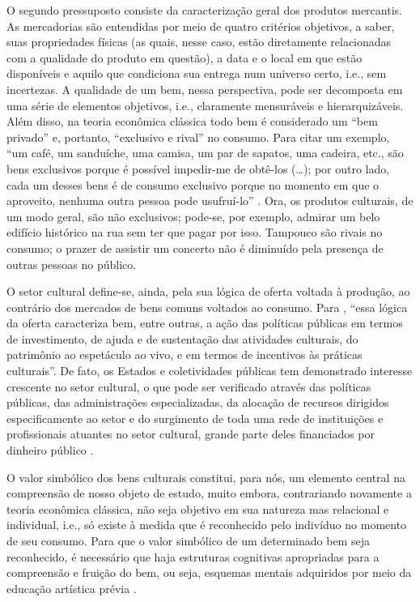 \documentclass[a4paper, 12pt, openright, oneside, german, french, english, brazil, article]{abntex2}
\begin{document}
O segundo pressuposto consiste da caracterização geral dos produtos mercantis. As mercadorias são entendidas por meio de quatro critérios objetivos, a saber, suas propriedades físicas (as quais, nesse caso, estão diretamente relacionadas com a qualidade do produto em questão), a data e o local em que estão disponíveis e aquilo que condiciona sua entrega num universo certo, i.e., sem incertezas. A qualidade de um bem, nessa perspectiva, pode ser decomposta em uma série de elementos objetivos, i.e., claramente mensuráveis e hierarquizáveis. Além disso, na teoria econômica clássica todo bem é considerado um ``bem privado'' e, portanto, ``exclusivo e rival'' no consumo. Para citar um exemplo, ``um café, um sanduíche, uma camisa, um par de sapatos, uma cadeira, etc., são bens exclusivos porque é possível impedir-me de obtê-los (\ldots); por outro lado, cada um desses bens é de consumo exclusivo porque no momento em que o aproveito, nenhuma outra pessoa pode usufruí-lo'' \cite[p. 29]{tolila2007cultura}. Ora, os produtos culturais, de um modo geral, são não exclusivos; pode-se, por exemplo, admirar um belo edifício histórico na rua sem ter que pagar por isso. Tampouco são rivais no consumo; o prazer de assistir um concerto não é diminuído pela presença de outras pessoas no público.

O setor cultural define-se, ainda, pela sua lógica de oferta voltada à produção, ao contrário dos mercados de bens comuns voltados ao consumo. Para , ``essa lógica da oferta caracteriza bem, entre outras, a ação das políticas públicas em termos de investimento, de ajuda e de sustentação das atividades culturais, do patrimônio ao espetáculo ao vivo, e em termos de incentivos às práticas culturais''. De fato, os Estados e coletividades públicas tem demonstrado interesse crescente no setor cultural, o que pode ser verificado através das políticas públicas, das administrações especializadas, da alocação de recursos dirigidos especificamente ao setor e do surgimento de toda uma rede de instituições e profissionais atuantes no setor cultural, grande parte deles financiados por dinheiro público \cite{tolila2007cultura}.

O valor simbólico dos bens culturais constitui, para nós, um elemento central na compreensão de nosso objeto de estudo, muito embora, contrariando novamente a teoria econômica clássica, não seja objetivo em sua natureza mas relacional e individual, i.e., só existe à medida que é reconhecido pelo indivíduo no momento de seu consumo. Para que o valor simbólico de um determinado bem seja reconhecido, é necessário que haja estruturas cognitivas apropriadas para a compreensão e fruição do bem, ou seja, esquemas mentais adquiridos por meio da educação artística prévia \cite{bourdieu2003amor}.
\end{document}
